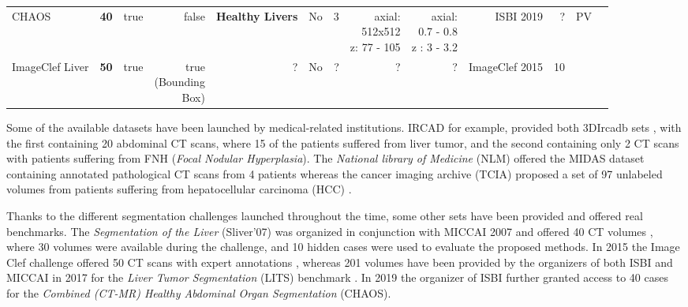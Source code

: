 \documentclass[]{article}
\begin{document}
\begin{landscape}
\begin{table}[!htp]
\begin{tabular}{lrrrrrrrrrrrr}
		CHAOS &\textbf{40} & true &false &\textbf{\parbox{1.5cm}{Healthy Livers}} &No &3 &\parbox{1.5cm}{axial:\\512x512\\z: 77 - 105} &\parbox{1.5cm}{axial:\\0.7 - 0.8\\z : 3 - 3.2}&ISBI 2019 &? &PV \\
		ImageClef Liver &\textbf{50} &true &\parbox[r]{1cm}{true\\(Bounding\\Box)} &? &No &? &? &? &ImageClef 2015 &10 & \\
		\bottomrule
	\end{tabular}
\end{table}
\end{landscape}


Some of the available datasets have been launched by medical-related
institutions. IRCAD for example, provided both 3DIrcadb sets \cite{3DIrcadB}, with the first containing 20 abdominal CT
scans, where 15 of the patients suffered from liver tumor, and the
second containing only 2 CT scans with patients suffering from FNH
(\emph{Focal Nodular Hyperplasia}).
The \emph{National library of Medicine} (NLM) offered the MIDAS dataset
containing annotated pathological CT scans from 4 patients \cite{MIDAS} whereas the cancer imaging archive (TCIA)
proposed a set of 97 unlabeled volumes from patients suffering from
hepatocellular carcinoma (HCC) \cite{Clark2013}.

Thanks to the different segmentation challenges launched throughout the
time, some other sets have been provided and offered real benchmarks.
The \emph{Segmentation of the Liver} (Sliver'07) was organized in
conjunction with MICCAI 2007 and offered 40 CT volumes \cite{VanGinneken2007}, where 30
volumes were available during the challenge, and 10 hidden cases were
used to evaluate the proposed methods. In 2015 the Image Clef challenge
offered 50 CT scans with expert annotations \cite{ImageClef}, whereas 201 volumes have been provided by the organizers
of both ISBI and MICCAI in 2017 for the \emph{Liver Tumor Segmentation}
(LITS) benchmark \cite{Bilic2019}. In 2019 the organizer of ISBI
further granted access to 40 cases for the \emph{Combined (CT-MR)
	Healthy Abdominal Organ Segmentation} (CHAOS)\cite{CHAOS}.
\end{document}
